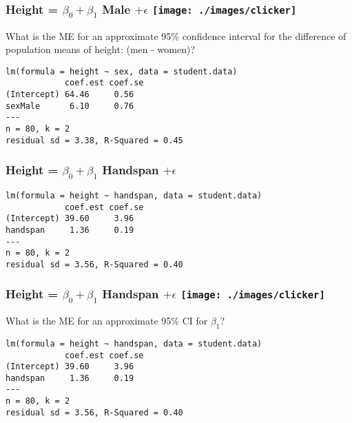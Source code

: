 \begin{frame}[fragile]
\frametitle{Height = $\beta_0 + \beta_1$ Male $+ \epsilon$ \hfill \texttt{[image: ./images/clicker]}}

\alert{What is the ME for an approximate 95\% confidence interval for the difference of population means of height: (men - women)?}

\footnotesize
\begin{verbatim}
lm(formula = height ~ sex, data = student.data)
            coef.est coef.se
(Intercept) 64.46     0.56  
sexMale      6.10     0.76  
---
n = 80, k = 2
residual sd = 3.38, R-Squared = 0.45
\end{verbatim}

\end{frame}





\begin{frame}[fragile]
\frametitle{Height = $\beta_0 + \beta_1$ Handspan $+ \epsilon$}
\footnotesize
\begin{verbatim}
lm(formula = height ~ handspan, data = student.data)
            coef.est coef.se
(Intercept) 39.60     3.96  
handspan     1.36     0.19  
---
n = 80, k = 2
residual sd = 3.56, R-Squared = 0.40
\end{verbatim}

\end{frame}
\begin{frame}[fragile]
\frametitle{Height = $\beta_0 + \beta_1$ Handspan $+ \epsilon$ \hfill \texttt{[image: ./images/clicker]}}
\alert{What is the ME for an approximate 95\% CI for $\beta_1$?}
\footnotesize
\begin{verbatim}
lm(formula = height ~ handspan, data = student.data)
            coef.est coef.se
(Intercept) 39.60     3.96  
handspan     1.36     0.19  
---
n = 80, k = 2
residual sd = 3.56, R-Squared = 0.40
\end{verbatim}
\end{frame}

